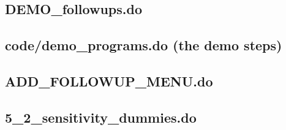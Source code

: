 \documentclass[11pt]{article}
\begin{document}
\subsection{DEMO\_followups.do}

\subsection{code/demo\_programs.do (the demo steps)}

\subsection{ADD\_FOLLOWUP\_MENU.do}

\subsection{5\_2\_sensitivity\_dummies.do}

\end{document}
